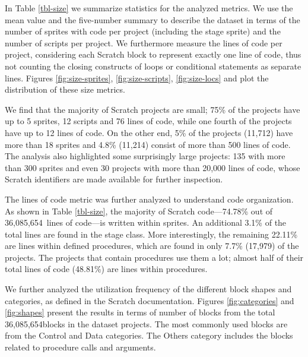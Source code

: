 \documentclass{sig-alternate}
\newcommand{\nLOC}{36,085,654}
\begin{document}
In Table \ref{tbl-size} we summarize statistics for the analyzed metrics. We use the mean value and the five-number summary to describe the dataset in terms of the number of sprites with code per project (including the stage sprite) and the number of scripts per project. We furthermore measure the lines of code per project, considering each Scratch block to represent exactly one line of code, thus not counting the closing constructs of loops or conditional statements as separate lines. Figures \ref{fig:size-sprites}, \ref{fig:size-scripts}, \ref{fig:size-locs} and plot the distribution of these size metrics.

We find that the majority of Scratch projects are small; 75\% of the projects have up to 5 sprites, 12 scripts and 76 lines of code, while one fourth of the projects have up to 12 lines of code. On the other end, 5\% of the projects (11,712) have more than 18 sprites and 4.8\% (11,214) consist of more than 500 lines of code. The analysis also highlighted some surprisingly large projects: 135 with more than 300 sprites and even 30 projects with more than 20,000 lines of code, whose Scratch identifiers are made available for further inspection.\footnotemark[\ref{repo}]

The lines of code metric was further analyzed to understand code organization. As shown in Table \ref{tbl-size}, the majority of Scratch code---74.78\% out of \nLOC~lines of code---is written within sprites. An additional 3.1\% of the total lines are found in the stage class. More interestingly, the remaining 22.11\% are lines within defined procedures, which are found in only 7.7\% (17,979) of the projects. The projects that contain procedures use them a lot; almost half of their total lines of code (48.81\%) are lines within procedures.

We further analyzed the utilization frequency of the different block shapes and categories, as defined in the Scratch documentation. Figures \ref{fig:categories} and \ref{fig:shapes} present the results in terms of number of blocks from the total \nLOC blocks in the dataset projects. The most commonly used blocks are from the Control and Data categories. The Others category includes the blocks related to procedure calls and arguments.
\end{document}

